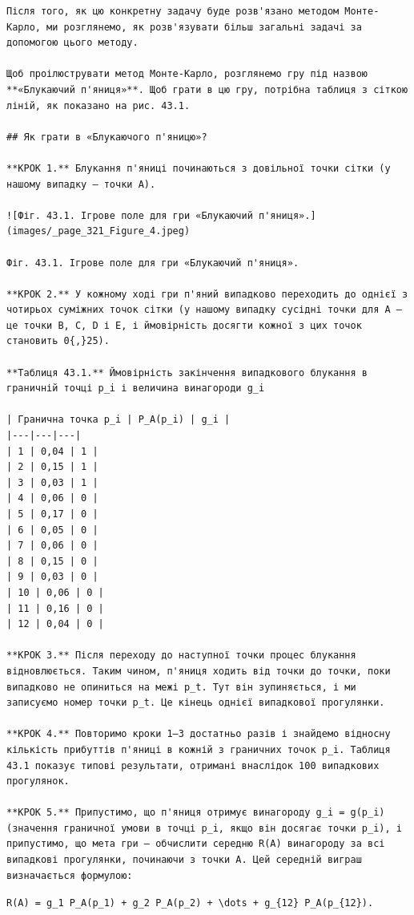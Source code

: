 \documentclass[
  ukrainian,
]{article}
\begin{document}
\begin{verbatim}
Після того, як цю конкретну задачу буде розв'язано методом Монте-Карло, ми розглянемо, як розв'язувати більш загальні задачі за допомогою цього методу.

Щоб проілюструвати метод Монте-Карло, розглянемо гру під назвою **«Блукаючий п'яниця»**. Щоб грати в цю гру, потрібна таблиця з сіткою ліній, як показано на рис. 43.1.

## Як грати в «Блукаючого п'яницю»?

**КРОК 1.** Блукання п'яниці починаються з довільної точки сітки (у нашому випадку — точки A).

![Фіг. 43.1. Ігрове поле для гри «Блукаючий п'яниця».](images/_page_321_Figure_4.jpeg)

Фіг. 43.1. Ігрове поле для гри «Блукаючий п'яниця».

**КРОК 2.** У кожному ході гри п'яний випадково переходить до однієї з чотирьох суміжних точок сітки (у нашому випадку сусідні точки для A — це точки B, C, D і E, і ймовірність досягти кожної з цих точок становить 0{,}25).

**Таблиця 43.1.** Ймовірність закінчення випадкового блукання в граничній точці p_i і величина винагороди g_i

| Гранична точка p_i | P_A(p_i) | g_i |
|---|---|---|
| 1 | 0,04 | 1 |
| 2 | 0,15 | 1 |
| 3 | 0,03 | 1 |
| 4 | 0,06 | 0 |
| 5 | 0,17 | 0 |
| 6 | 0,05 | 0 |
| 7 | 0,06 | 0 |
| 8 | 0,15 | 0 |
| 9 | 0,03 | 0 |
| 10 | 0,06 | 0 |
| 11 | 0,16 | 0 |
| 12 | 0,04 | 0 |

**КРОК 3.** Після переходу до наступної точки процес блукання відновлюється. Таким чином, п'яниця ходить від точки до точки, поки випадково не опиниться на межі p_t. Тут він зупиняється, і ми записуємо номер точки p_t. Це кінець однієї випадкової прогулянки.

**КРОК 4.** Повторимо кроки 1–3 достатньо разів і знайдемо відносну кількість прибуттів п'яниці в кожній з граничних точок p_i. Таблиця 43.1 показує типові результати, отримані внаслідок 100 випадкових прогулянок.

**КРОК 5.** Припустимо, що п'яниця отримує винагороду g_i = g(p_i) (значення граничної умови в точці p_i, якщо він досягає точки p_i), і припустимо, що мета гри — обчислити середню R(A) винагороду за всі випадкові прогулянки, починаючи з точки A. Цей середній виграш визначається формулою:
\end{verbatim}

\texttt{R(A)\ =\ g\_1\ P\_A(p\_1)\ +\ g\_2\ P\_A(p\_2)\ +\ \textbackslash{}dots\ +\ g\_\{12\}\ P\_A(p\_\{12\}).}
\end{document}
